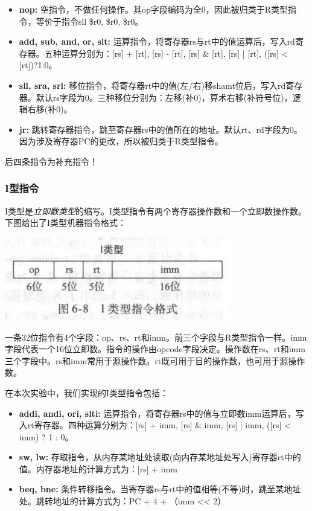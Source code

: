 \documentclass[twocolumn]{article} %
\begin{document}
\begin{sloppypar}
\begin{itemize}
\item {\bf nop:} 空指令，不做任何操作。其op字段编码为全0，因此被归类于R类型指令，等价于指令sll \$r0, \$r0, \$r0。
\item {\bf add, sub, and, or, slt:} 运算指令，将寄存器rs与rt中的值运算后，写入rd寄存器。五种运算分别为：[rs] + [rt], [rs] - [rt], [rs] \& [rt], [rs] | [rt], ([rs] < [rt])?1:0。
\item {\bf sll, sra, srl:} 移位指令，将寄存器rt中的值(左/右)移shamt位后，写入rd寄存器。默认rs字段为0。三种移位分别为：左移(补0)，算术右移(补符号位)，逻辑右移(补0)。
\item {\bf jr:} 跳转寄存器指令，跳至寄存器rs中的值所在的地址。默认rt、rd字段为0。因为涉及寄存器PC的更改，所以被归类于R类型指令。
\end{itemize}

{\color{red} 后四条指令为补充指令！}

\subsubsection{I型指令}

I类型是{\em 立即数类型}的缩写。I类型指令有两个寄存器操作数和一个立即数操作数。下图给出了I类型机器指令格式：

\includegraphics[width =0.9 \linewidth]{figure/Itype.png}

一条32位指令有4个字段：op、rs、rt和imm。前三个字段与R类型指令一样。imm字段代表一个16位立即数。指令的操作由opcode字段决定。操作数在rs、rt和imm三个字段中。rs和imm常用于源操作数。rt既可用于目的操作数，也可用于源操作数。

在本次实验中，我们实现的I类型指令包括：

\begin{itemize}
\item {\bf addi, andi, ori, slti:} 运算指令，将寄存器rs中的值与立即数imm运算后，写入rt寄存器。四种运算分别为：[rs] + imm, [rs] \& imm, [rs] | imm, ([rs] < imm) ? 1 : 0。
\item {\bf sw, lw:} 存取指令，从内存某地址处读取(向内存某地址处写入)寄存器rt中的值。内存器地址的计算方式为：[rs] + imm
\item {\bf beq, bne:} 条件转移指令。当寄存器rs与rt中的值相等(不等)时，跳至某地址处。跳转地址的计算方式为：PC + 4 + （imm << 2）
\end{itemize}


\end{sloppypar}
\end{document}
